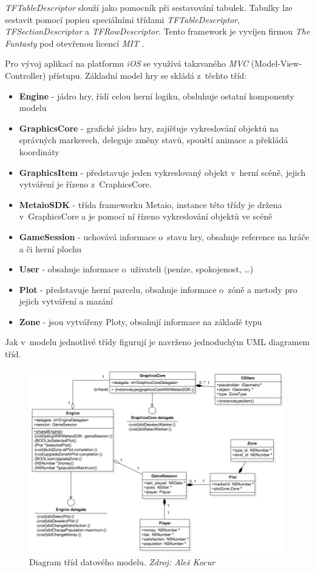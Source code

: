 \documentclass[twoside,12pt]{article}
\begin{document}
\textit{TFTableDescriptor} slouží jako pomocník při sestavování tabulek. Tabulky lze sestavit pomocí popisu  speciálními třídami \textit{TFTableDescriptor}, \textit{TFSectionDescriptor} a \textit{TFRowDescriptor}. Tento framework je vyvíjen firmou \textit{The Funtasty} pod otevřenou licencí \textit{MIT} \cite{tftabledescriptor}.

Pro vývoj aplikací na platformu \textit{iOS} se využívá takzvaného \textit{MVC} (Model-View-Controller) přístupu. Základní model hry se skládá z~těchto tříd:

\begin{itemize}
	\item \textbf{Engine} - jádro hry, řídí celou herní logiku, obsluhuje ostatní komponenty modelu
	\item \textbf{GraphicsCore} - grafické jádro hry, zajišťuje vykreslování objektů na správných markerech, deleguje změny stavů, spouští animace a překládá koordináty
	\item \textbf{GraphicsItem} - představuje jeden vykreslovaný objekt v~herní scéně, jejich vytváření je řízeno z~CraphicsCore.
	\item \textbf{MetaioSDK} - třída frameworku Metaio, instance této třídy je držena v~GraphicsCore a je pomocí ní řízeno vykreslování objektů ve scéně
	\item \textbf{GameSession} - uchovává informace o~stavu hry, obsahuje reference na hráče a či herní plochu
	\item \textbf{User} - obsahuje informace o~uživateli (peníze, spokojenost, \dots)
	\item \textbf{Plot} - představuje herní parcelu, obsahuje informace o~zóně a metody pro jejich vytváření a mazání
	\item \textbf{Zone} - jsou vytvářeny Ploty, obsahují informace na základě typu
\end{itemize}

Jak v~modelu jednotlivé třídy figurují je navrženo jednoduchým UML diagramem tříd.

\begin{figure}[H]
\centering
    \includegraphics[width=420px, center]{images/model.png}
\captionsetup{justification=centering}
    \caption[]{Diagram tříd datového modelu. \textit{Zdroj: Aleš Kocur}}
    \label{class_diagram}
\end{figure}
\end{document}
